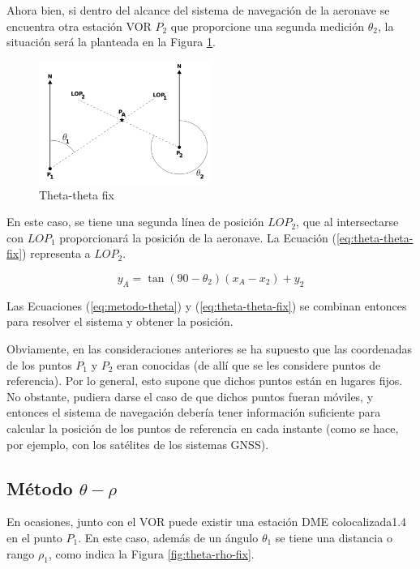 \documentclass[a4paper,12pt,twoside]{article}
\begin{document}
Ahora bien, si dentro del alcance del sistema de navegaci\'on de la aeronave se encuentra otra estaci\'on VOR $P_2$ que proporcione una segunda medici\'on $\theta_2$, la situaci\'on ser\'a la planteada en la Figura \ref{fig:Theta-theta-fix}.

\begin{figure}[!h]
  \centering
  \includegraphics[width=0.5\textwidth]{./Imagenes/theta-theta-fix.png}
  \caption{Theta-theta fix}
  \label{fig:Theta-theta-fix}
\end{figure}

En este caso, se tiene una segunda l\'inea de posici\'on $LOP_2$, que al intersectarse con $LOP_1$ proporcionar\'a la posici\'on de la aeronave. La Ecuaci\'on (\ref  {eq:theta-theta-fix}) representa a $LOP_2$.

\begin{equation}
  \label{eq:theta-theta-fix}
 y_A = \tan (90-\theta_2) (x_A-x_2) + y_2   
\end{equation}


Las Ecuaciones (\ref{eq:metodo-theta}) y (\ref  {eq:theta-theta-fix}) se combinan entonces para resolver el sistema y obtener la posici\'on.

Obviamente, en las consideraciones anteriores se ha supuesto que las coordenadas de los puntos $P_1$ y $P_2$ eran conocidas (de all\'i que se les considere puntos de referencia). Por lo general, esto supone que dichos puntos est\'an en lugares fijos. No obstante, pudiera darse el caso de que dichos puntos fueran m\'oviles, y entonces el sistema de navegaci\'on deber\'ia tener informaci\'on suficiente para calcular la posici\'on de los puntos de referencia en cada instante (como se hace, por ejemplo, con los sat\'elites de los sistemas GNSS). 

\subsection{M\'etodo $\theta-\rho$}

En ocasiones, junto con el VOR puede existir una estaci\'on DME colocalizada1.4 en el punto $P_1$. En este caso, adem\'as de un \'angulo $\theta_1$ se tiene una distancia o rango $\rho_1$, como indica la Figura \ref{fig:theta-rho-fix}.
\end{document}
